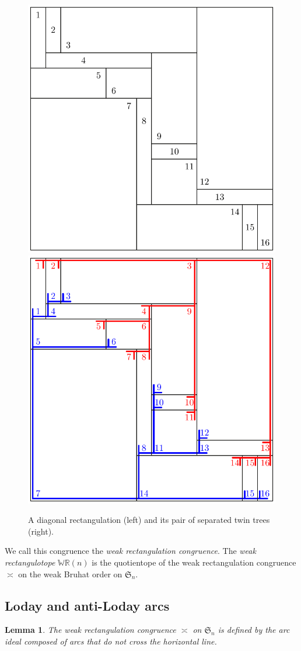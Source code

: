\documentclass{amsart}
\newtheorem{lemma}[theorem]{Lemma}
\theoremstyle{definition}
\newcommand{\f}[1]{\mathfrak{#1}} %
\newcommand{\darkblue}{\color{darkblue}} %
\newcommand{\defn}[1]{\textsl{\darkblue #1}} %
\newcommand{\polytope}[1]{\mathds{#1}} %
\newcommand{\WRP}{\polytope{WR}} %
\newcommand{\baxtereq}{\asymp}%
\begin{document}
\begin{figure}
	\centerline{\includegraphics[width=.5\textwidth]{weakRectangulation} \qquad \includegraphics[width=.5\textwidth]{weakRectangulationTrees}}
	\caption{A diagonal rectangulation (left) and its pair of separated twin trees (right).}
	\label{fig:weakRectangulation}
\end{figure}

We call this congruence the \defn{weak rectangulation congruence}.
The \defn{weak rectangulotope} $\WRP(n)$ is the quotientope of the weak rectangulation congruence $\baxtereq$ on the weak Bruhat order on $\f{S}_n$.

\subsection{Loday and anti-Loday arcs}

\begin{lemma}
The weak rectangulation congruence $\baxtereq$ on $\f{S}_n$ is defined by the arc ideal composed of arcs that do not cross the horizontal line.
\end{lemma}
\end{document}
